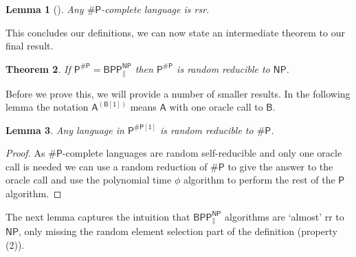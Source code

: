 \documentclass[10pt,a4paper]{article}
\newtheorem{theorem}{Theorem}
\newtheorem{lemma}[theorem]{Lemma}
\begin{document}
\begin{lemma}[\cite{feigenbaum1990random}]\label{lma: perm is rsr}
    Any $\mathsf{\#P}$-complete language is rsr.
\end{lemma}

This concludes our definitions, we can now state an intermediate theorem to our final result.

\begin{theorem}\label{thm: BPP is rr to NP}
    If $\mathsf{P^{\# P}= BPP_{\parallel}^{NP}}$ then $\mathsf{P^{\# P}}$ is random reducible to $\mathsf{NP}$.
\end{theorem}

Before we prove this, we will provide a number of smaller results. In the following lemma the notation $\mathsf{A^{(B[1])}}$ means $\mathsf{A}$ with one oracle call to $\mathsf{B}$.

\begin{lemma}\label{lma: P to 1 sharp P is rr to 1 sharp P}
    Any language in $\mathsf{P^{\# P[1]}}$ is random reducible to $\mathsf{\# P}$.
\end{lemma}
\begin{proof}
    As $\mathsf{\# P}$-complete languages are random self-reducible and only one oracle call is needed we can use a random reduction of $\mathsf{\# P}$ to give the answer to the oracle call and use the polynomial time $\phi$ algorithm to perform the rest of the $\mathsf{P}$ algorithm.
\end{proof}

The next lemma captures the intuition that $\mathsf{BPP^{NP}_{\parallel}}$ algorithms are `almost' rr to $\mathsf{NP}$, only missing the random element selection part of the definition (property (2)).
\end{document}

